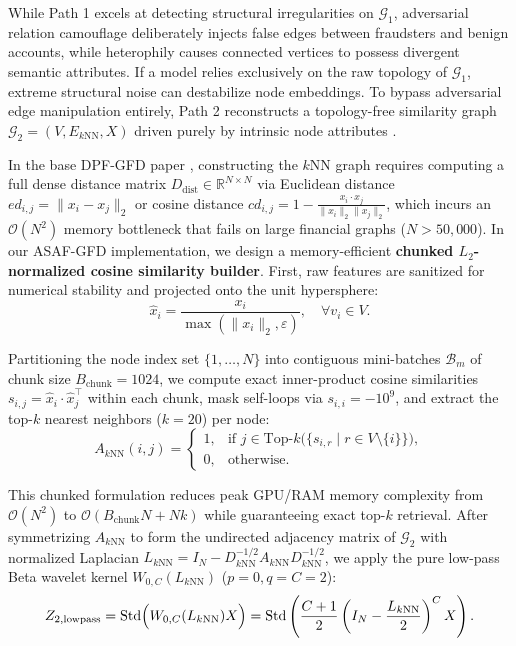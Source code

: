\documentclass[10pt,a4paper,twocolumn]{article}
\begin{document}
While Path 1 excels at detecting structural irregularities on $\mathscr{G}_1$, adversarial relation camouflage deliberately injects false edges between fraudsters and benign accounts, while heterophily causes connected vertices to possess divergent semantic attributes. If a model relies exclusively on the raw topology of $\mathscr{G}_1$, extreme structural noise can destabilize node embeddings. To bypass adversarial edge manipulation entirely, Path 2 reconstructs a topology-free similarity graph $\mathscr{G}_2 = (V, E_{k\text{NN}}, X)$ driven purely by intrinsic node attributes \cite{ref35,ref36}.

In the base DPF-GFD paper \cite{ref9}, constructing the $k$NN graph requires computing a full dense distance matrix $D_{\text{dist}} \in \mathbb{R}^{N \times N}$ via Euclidean distance $ed_{i,j} = \|x_i - x_j\|_2$ or cosine distance $cd_{i,j} = 1 - \frac{x_i \cdot x_j}{\|x_i\|_2 \|x_j\|_2}$, which incurs an $\mathscr{O}(N^2)$ memory bottleneck that fails on large financial graphs ($N > 50,000$). In our ASAF-GFD implementation, we design a memory-efficient \textbf{chunked $L_2$-normalized cosine similarity builder}. First, raw features are sanitized for numerical stability and projected onto the unit hypersphere:
\begin{equation}
  \hat{x}_i = \frac{x_i}{\max(\|x_i\|_2, \varepsilon)}, \quad \forall v_i \in V.
\end{equation}

Partitioning the node index set $\{1, \dots, N\}$ into contiguous mini-batches $\mathscr{B}_m$ of chunk size $B_{\text{chunk}} = 1024$, we compute exact inner-product cosine similarities $s_{i,j} = \hat{x}_i \cdot \hat{x}_j^\top$ within each chunk, mask self-loops via $s_{i,i} = -10^9$, and extract the top-$k$ nearest neighbors ($k = 20$) per node:
\begin{equation}
  A_{k\text{NN}}(i, j) = \begin{cases}
    1, & \text{if } j \in \text{Top-}k\big(\{s_{i,r} \mid r \in V \setminus \{i\}\}\big), \\
    0, & \text{otherwise}.
  \end{cases}
\end{equation}

This chunked formulation reduces peak GPU/RAM memory complexity from $\mathscr{O}(N^2)$ to $\mathscr{O}(B_{\text{chunk}} N + Nk)$ while guaranteeing exact top-$k$ retrieval. After symmetrizing $A_{k\text{NN}}$ to form the undirected adjacency matrix of $\mathscr{G}_2$ with normalized Laplacian $L_{k\text{NN}} = I_N - D_{k\text{NN}}^{-1/2} A_{k\text{NN}} D_{k\text{NN}}^{-1/2}$, we apply the pure low-pass Beta wavelet kernel $W_{0,C}(L_{k\text{NN}})$ ($p = 0, q = C = 2$):
\begin{equation}
  \resizebox{0.89\linewidth}{!}{$\displaystyle Z_{2,\text{lowpass}} = \text{Std}\Big(W_{0,C}(L_{k\text{NN}}) X\Big) = \text{Std}\left(\frac{C+1}{2}\left(I_N - \frac{L_{k\text{NN}}}{2}\right)^C X\right).$}
\end{equation}
\end{document}
